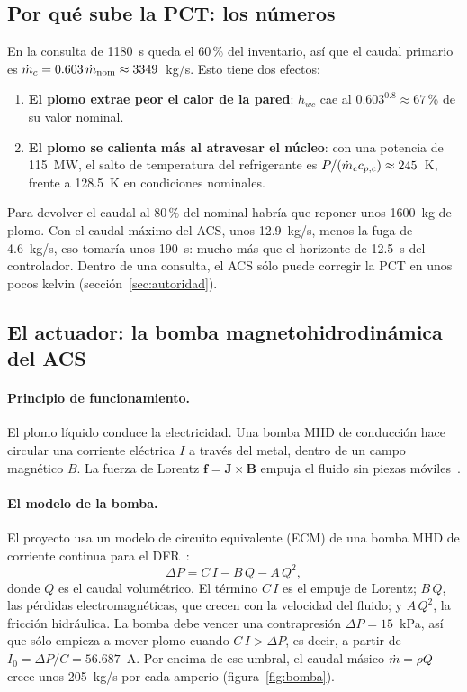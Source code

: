 \subsection{Por qué sube la PCT: los números}
En la consulta de 1180~s queda el 60\,\% del inventario, así que el caudal primario es
$\dot m_c=0.603\,\dot m_{\rm nom}\approx3349$~kg/s. Esto tiene dos efectos:
\begin{enumerate}
  \item \textbf{El plomo extrae peor el calor de la pared}: $h_{wc}$ cae al
        $0.603^{0.8}\approx67$\,\% de su valor nominal.
  \item \textbf{El plomo se calienta más al atravesar el núcleo}: con una potencia de
        115~MW, el salto de temperatura del refrigerante es
        $P/(\dot m_cc_{p,c})\approx245$~K, frente a 128.5~K en condiciones nominales.
\end{enumerate}
Para devolver el caudal al 80\,\% del nominal habría que reponer unos 1600~kg de plomo. Con el
caudal máximo del ACS, unos 12.9~kg/s, menos la fuga de 4.6~kg/s, eso tomaría unos 190~s:
mucho más que el horizonte de 12.5~s del controlador. Dentro de una consulta, el ACS sólo
puede corregir la PCT en unos pocos kelvin (sección~\ref{sec:autoridad}).

\subsection{El actuador: la bomba magnetohidrodinámica del ACS}
\paragraph{Principio de funcionamiento.} El plomo líquido conduce la electricidad. Una bomba
MHD de conducción hace circular una corriente eléctrica $I$ a través del metal, dentro de un
campo magnético $B$. La fuerza de Lorentz $\mathbf f=\mathbf J\times\mathbf B$ empuja el fluido
sin piezas móviles~\cite{nowak2022}.

\paragraph{El modelo de la bomba.} El proyecto usa un modelo de circuito equivalente (ECM) de
una bomba MHD de corriente continua para el DFR~\cite{nowak2022}:
\[
\Delta P=C\,I-B\,Q-A\,Q^2,
\]
donde $Q$ es el caudal volumétrico. El término $C\,I$ es el empuje de Lorentz; $B\,Q$, las
pérdidas electromagnéticas, que crecen con la velocidad del fluido; y $A\,Q^2$, la fricción
hidráulica. La bomba debe vencer una contrapresión $\Delta P=15$~kPa, así que sólo empieza a
mover plomo cuando $C\,I>\Delta P$, es decir, a partir de $I_0=\Delta P/C=56.687$~A. Por encima
de ese umbral, el caudal másico $\dot m=\rho Q$ crece unos 205~kg/s por cada amperio
(figura~\ref{fig:bomba}).

